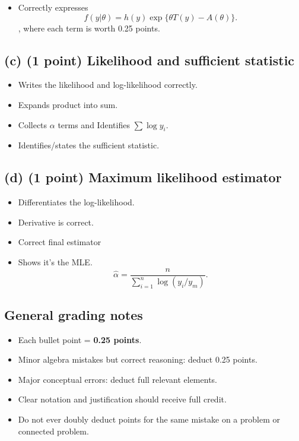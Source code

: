 \documentclass[12pt]{article}
\begin{document}
\begin{itemize}
\item Correctly expresses
\[
f(y|\theta)=h(y)\exp\{\theta T(y)-A(\theta)\}.
\], where each term is worth 0.25 points.
\end{itemize}

\subsection*{(c) (1 point) Likelihood and sufficient statistic}

\begin{itemize}
\item Writes the likelihood and log-likelihood correctly.
\item Expands product into sum.
\item Collects $\alpha$ terms and Identifies $\sum \log y_i$.
\item Identifies/states the sufficient statistic.
\end{itemize}

\subsection*{(d) (1 point) Maximum likelihood estimator}

\begin{itemize}
\item Differentiates the log-likelihood.
\item Derivative is correct. 
\item Correct final estimator
\item Shows it's the MLE. 
\[
\hat{\alpha}=\frac{n}{\sum_{i=1}^n \log(y_i/y_m)}.
\]
\end{itemize}


\subsection*{General grading notes}

\begin{itemize}
\item Each bullet point = \textbf{0.25 points}.
\item Minor algebra mistakes but correct reasoning: deduct 0.25 points.
\item Major conceptual errors: deduct full relevant elements.
\item Clear notation and justification should receive full credit.
\item Do not ever doubly deduct points for the same mistake on a problem or connected problem.
\end{itemize}
\end{document}
